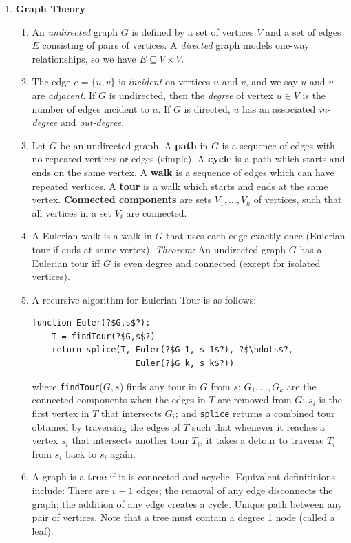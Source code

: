 \documentclass[10pt]{article}
\begin{document}
\begin{multicols}{2}
\begin{enumerate}
    \item \textbf{Graph Theory} 
    \begin{enumerate}
        \item An \textit{undirected} graph $G$ is defined by a set of vertices $V$ and a set of edges $E$ consisting of pairs of vertices. A \textit{directed} graph models one-way relationships, so we have $E \subseteq V \times V$.
        \item The edge $e = \{u, v \}$ is \textit{incident} on vertices $u$ and $v$, and we say $u$ and $v$ are \textit{adjacent}. If $G$ is undirected, then the \textit{degree} of vertex $u \in V$ is the number of edges incident to $u$. If $G$ is directed, $u$ has an associated \textit{in-degree} and \textit{out-degree}.
        \item Let $G$ be an undirected graph. A \textbf{path} in $G$ is a sequence of edges with no repeated vertices or edges (simple). A \textbf{cycle} is a path which starts and ends on the same vertex. A \textbf{walk} is a sequence of edges which can have repeated vertices. A \textbf{tour} is a walk which starts and ends at the same vertex. \textbf{Connected components} are sets $V_1,\hdots,V_k$ of vertices, such that all vertices in a set $V_i$ are connected.
        \item A Eulerian walk is a walk in $G$ that uses each edge exactly once (Eulerian tour if ends at same vertex). \textit{Theorem:} An undirected graph $G$ has a Eulerian tour iff $G$ is even degree and connected (except for isolated vertices). 
        \item A recursive algorithm for Eulerian Tour is as follows:
        \begin{verbatim}
function Euler(?$G,s$?): 
    T = findTour(?$G,s$?) 
    return splice(T, Euler(?$G_1, s_1$?), ?$\hdots$?, 
                     Euler(?$G_k, s_k$?))
        \end{verbatim}
        where \texttt{findTour}($G,s$) finds any tour in $G$ from $s$; $G_1, \hdots,G_k$ are the connected components when the edges in $T$ are removed from $G$; $s_i$ is the first vertex in $T$ that intersects $G_i$; and \texttt{splice} returns a combined tour obtained by traversing the edges of $T$ such that whenever it reaches a vertex $s_i$ that intersects another tour $T_i$, it takes a detour to traverse $T_i$ from $s_i$ back to $s_i$ again.
        \item A graph is a \textbf{tree} if it is connected and acyclic. Equivalent definitinions include: There are $v-1$ edges; the removal of any edge disconnects the graph; the addition of any edge creates a cycle. Unique path between any pair of vertices. Note that a tree must contain a degree 1 node (called a leaf).

\end{enumerate}
\end{enumerate}
\end{multicols}
\end{document}
